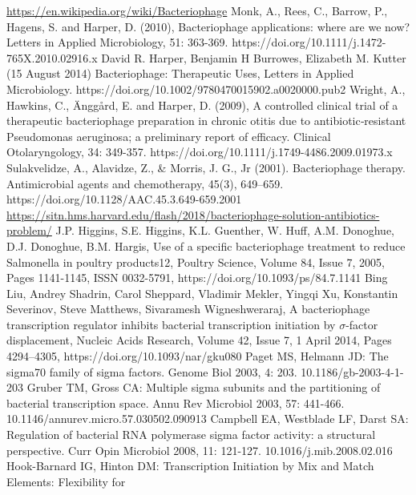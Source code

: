 \documentclass[14pt]{extarticle}
\begin{document}
\begin{thebibliography}{9}
     \url{https://en.wikipedia.org/wiki/Bacteriophage}
     Monk, A., Rees, C., Barrow, P., Hagens, S. and Harper, D. (2010), Bacteriophage applications: 
    where are we now? Letters in Applied Microbiology, 51: 363-369. https://doi.org/10.1111/j.1472-765X.2010.02916.x
     David R. Harper, Benjamin H Burrowes, Elizabeth M. Kutter (15 August 2014) Bacteriophage: 
    Therapeutic Uses, Letters in Applied Microbiology.  https://doi.org/10.1002/9780470015902.a0020000.pub2
     Wright, A., Hawkins, C., Änggård, E. and Harper, D. (2009), A controlled clinical trial of a 
    therapeutic bacteriophage preparation in chronic otitis due to antibiotic‐resistant Pseudomonas aeruginosa; a 
    preliminary report of efficacy. Clinical Otolaryngology, 34: 349-357. 
    https://doi.org/10.1111/j.1749-4486.2009.01973.x
     Sulakvelidze, A., Alavidze, Z., \& Morris, J. G., Jr (2001). Bacteriophage therapy. 
    Antimicrobial agents and chemotherapy, 45(3), 649–659. https://doi.org/10.1128/AAC.45.3.649-659.2001
     \url{https://sitn.hms.harvard.edu/flash/2018/bacteriophage-solution-antibiotics-problem/}
     J.P. Higgins, S.E. Higgins, K.L. Guenther, W. Huff, A.M. Donoghue, D.J. Donoghue, B.M. Hargis, 
    Use of a specific bacteriophage treatment to reduce Salmonella in poultry products12, Poultry Science, Volume 84, 
    Issue 7, 2005, Pages 1141-1145, ISSN 0032-5791, https://doi.org/10.1093/ps/84.7.1141
     Bing Liu, Andrey Shadrin, Carol Sheppard, Vladimir Mekler, Yingqi Xu, Konstantin Severinov, 
    Steve Matthews, Sivaramesh Wigneshweraraj, A bacteriophage transcription regulator inhibits bacterial transcription 
    initiation by $\sigma$-factor displacement, Nucleic Acids Research, Volume 42, Issue 7, 1 April 2014, Pages 
    4294–4305, 
    https://doi.org/10.1093/nar/gku080 
     Paget MS, Helmann JD: The sigma70 family of sigma factors. Genome Biol 2003, 4: 203. 
    10.1186/gb-2003-4-1-203
     Gruber TM, Gross CA: Multiple sigma subunits and the partitioning of bacterial transcription space. 
    Annu Rev Microbiol 2003, 57: 441-466. 10.1146/annurev.micro.57.030502.090913
      Campbell EA, Westblade LF, Darst SA: Regulation of bacterial RNA polymerase sigma factor activity: a 
    structural perspective. Curr Opin Microbiol 2008, 11: 121-127. 10.1016/j.mib.2008.02.016
     Hook-Barnard IG, Hinton DM: Transcription Initiation by Mix and Match Elements: Flexibility for 

\end{thebibliography}
\end{document}
